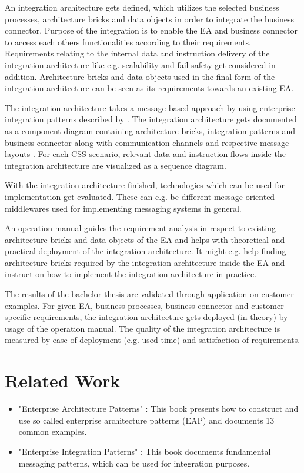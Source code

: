\documentclass{article}
\begin{document}
An integration architecture gets defined, which utilizes the selected business processes, architecture 
bricks and data objects in order to integrate the business connector. Purpose of the integration is to enable 
the EA and business connector to access each others functionalities according to their requirements.
Requirements relating to the internal data and instruction delivery of the integration architecture 
like e.g. scalability and fail safety get considered in addition.
Architecture bricks and data objects used in the final form of the 
integration architecture can be seen as its requirements towards an existing EA.

The integration architecture takes a message based approach by using enterprise integration patterns described
by \textcite{integrationPatterns}.
The integration architecture gets documented as a component diagram
containing architecture bricks, integration patterns and business connector along with communication 
channels and respective message layouts \cite[cf. 16 ff.]{integrationPatterns}.
For each CSS scenario, relevant data and instruction flows inside the integration architecture 
are visualized as a sequence diagram.

With the integration architecture finished, technologies which can be used for implementation get evaluated.
These can e.g. be different message oriented middlewares used for implementing messaging systems in general.

An operation manual guides the requirement analysis in respect to existing architecture bricks and data 
objects of the EA and helps with theoretical and practical deployment of the integration architecture.
It might e.g. help finding architecture bricks required by the integration architecture inside the EA 
and instruct on how to implement the integration architecture in practice.

The results of the bachelor thesis are validated through application on customer examples. For given 
EA, business processes, business connector and customer specific requirements, the integration architecture gets 
deployed (in theory) by usage of the operation manual.
The quality of the integration architecture is measured by ease of deployment (e.g. used time) and 
satisfaction of requirements.

\section{Related Work}

\begin{itemize}
    \item "Enterprise Architecture Patterns" \cite{architecturePatterns}: This book presents how to construct and use so 
    called enterprise architecture patterns (EAP) and documents 13 common examples. 
    \item "Enterprise Integration Patterns" \cite{integrationPatterns}: This book documents fundamental messaging patterns, 
    which can be used for integration purposes.
\end{itemize}
\end{document}
